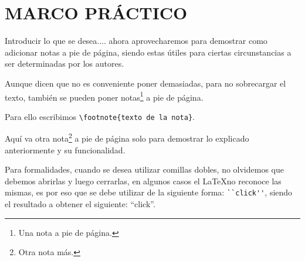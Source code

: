 
\newpage

%
%

\section{MARCO PRÁCTICO}
Introducir lo que se desea.... ahora aprovecharemos para demostrar como adicionar notas a pie de página, siendo estas útiles para ciertas circunstancias a ser determinadas por los autores.

Aunque dicen que no es conveniente poner demasiadas, para no sobrecargar el texto, también se pueden poner notas\footnote{Una nota a pie de página.} a pie de página. 

Para ello escribimos \verb|\footnote{texto de la nota}|. 

Aquí va otra nota\footnote{Otra nota más.} a pie de página solo para demostrar lo explicado anteriormente y su funcionalidad. 

Para formalidades, cuando se desea utilizar comillas dobles, no olvidemos que debemos abrirlas y luego cerrarlas, en algunos casos el \LaTeX no reconoce las mismas, es por eso que se debe utilizar de la siguiente forma: \verb|``click''|, siendo el resultado a obtener el siguiente: ``click''. 